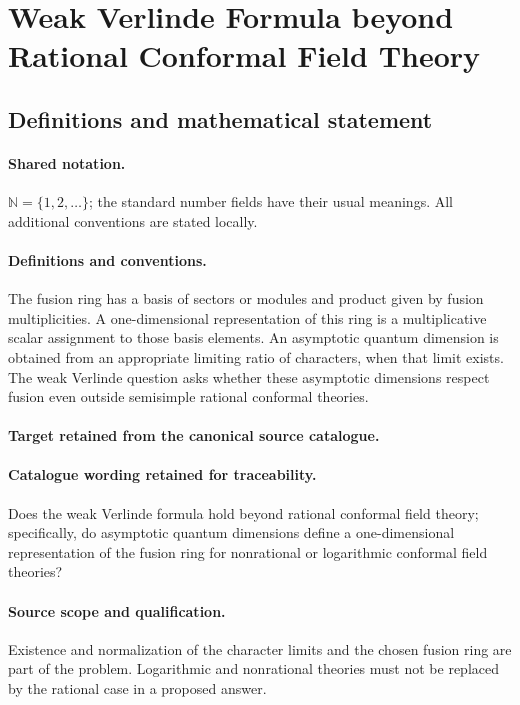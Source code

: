 \documentclass[11pt]{article}
\begin{document}
\section{Weak Verlinde Formula beyond Rational Conformal Field Theory}\label{statement}

\subsection{Definitions and mathematical statement}

\paragraph{Shared notation.}$\mathbb N=\{1,2,\ldots\}$; the standard number fields have their usual meanings. All additional conventions are stated locally.


\paragraph{Definitions and conventions.}
The fusion ring has a basis of sectors or modules and product given by fusion multiplicities. A one-dimensional representation of this ring is a multiplicative scalar assignment to those basis elements. An asymptotic quantum dimension is obtained from an appropriate limiting ratio of characters, when that limit exists. The weak Verlinde question asks whether these asymptotic dimensions respect fusion even outside semisimple rational conformal theories.

\paragraph{Target retained from the canonical source catalogue.}
\paragraph{Catalogue wording retained for traceability.}
Does the weak Verlinde formula hold beyond rational conformal field theory; specifically, do asymptotic quantum dimensions define a one-dimensional representation of the fusion ring for nonrational or logarithmic conformal field theories?

\paragraph{Source scope and qualification.}
Existence and normalization of the character limits and the chosen fusion ring are part of the problem. Logarithmic and nonrational theories must not be replaced by the rational case in a proposed answer.
\end{document}
